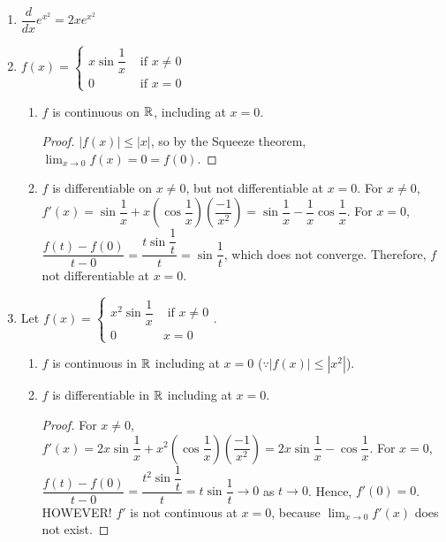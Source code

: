 \begin{example}
	\begin{enumerate}
		\item $\dfrac{d}{dx}e^{x^2}=2xe^{x^{2}}$
		\item $f(x)=\begin{cases}
				      x \sin{\dfrac{1}{x}} & \text{ if } x\neq 0 \\
				      0                    & \text{ if } x=0
			      \end{cases}$
		      \begin{remark}
			      \begin{enumerate}
				      \item
				            $f$ is continuous on $\mathbb{R}$, including at $x=0$.
				            \begin{proof}
					            $|f(x)|\le |x|$, so by the Squeeze theorem, $\lim_{x\to 0}{f(x)}=0=f(0)$.
				            \end{proof}
				      \item $f$ is differentiable on $x\neq 0$, but not differentiable at $x=0$.
				            For $x\neq 0$, $f'(x)=\sin{\dfrac{1}{x}}+x(\cos{\dfrac{1}{x}})(\dfrac{-1}{x^2})=\sin{\dfrac{1}{x}}-\dfrac{1}{x}\cos{\dfrac{1}{x}}$.
				            For $x=0$, $\dfrac{f(t)-f(0)}{t-0}=\dfrac{t \sin{\dfrac{1}{t}}}{t}=\sin{\dfrac{1}{t}}$, which does not converge. Therefore, $f$ not differentiable at $x=0$.
			      \end{enumerate}
		      \end{remark}
		\item Let $f(x)= \begin{cases}
				      x^2 \sin{\dfrac{1}{x}} & \text{ if } x\neq 0 \\
				      0                      & x=0
			      \end{cases}$.
		      \begin{enumerate}
			      \item
			            $f$ is continuous in $\mathbb{R}$ including at $x=0$ ($\because |f(x)|\le |x^2|$).
			      \item $f$ is differentiable in $\mathbb{R}$ including at $x=0$.
			            \begin{proof}
				            For $x\neq 0$, $f'(x)=2x \sin{\dfrac{1}{x}}+x^2(\cos{\dfrac{1}{x}})(\dfrac{-1}{x^2})=2x \sin{\dfrac{1}{x}}-\cos{\dfrac{1}{x}}$.
				            For $x=0$, $\dfrac{f(t)-f(0)}{t-0}= \dfrac{t^2 \sin{\dfrac{1}{t}}}{t}=t \sin{\dfrac{1}{t}}\to 0$ as $t\to 0$. Hence, $f'(0)=0$.
				            HOWEVER! $f'$ is not continuous at $x=0$, because $\lim_{x\to 0}{f'(x)}$ does not exist.
			            \end{proof}
		      \end{enumerate}
	\end{enumerate}
\end{example}


